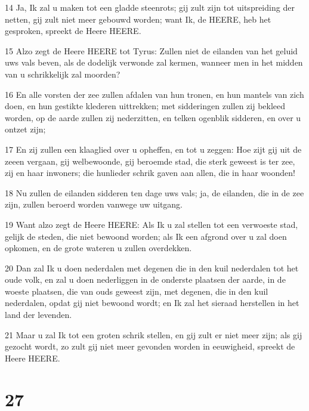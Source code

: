 \par 14 Ja, Ik zal u maken tot een gladde steenrots; gij zult zijn tot uitspreiding der netten, gij zult niet meer gebouwd worden; want Ik, de HEERE, heb het gesproken, spreekt de Heere HEERE.
\par 15 Alzo zegt de Heere HEERE tot Tyrus: Zullen niet de eilanden van het geluid uws vals beven, als de dodelijk verwonde zal kermen, wanneer men in het midden van u schrikkelijk zal moorden?
\par 16 En alle vorsten der zee zullen afdalen van hun tronen, en hun mantels van zich doen, en hun gestikte klederen uittrekken; met sidderingen zullen zij bekleed worden, op de aarde zullen zij nederzitten, en telken ogenblik sidderen, en over u ontzet zijn;
\par 17 En zij zullen een klaaglied over u opheffen, en tot u zeggen: Hoe zijt gij uit de zeeen vergaan, gij welbewoonde, gij beroemde stad, die sterk geweest is ter zee, zij en haar inwoners; die hunlieder schrik gaven aan allen, die in haar woonden!
\par 18 Nu zullen de eilanden sidderen ten dage uws vals; ja, de eilanden, die in de zee zijn, zullen beroerd worden vanwege uw uitgang.
\par 19 Want alzo zegt de Heere HEERE: Als Ik u zal stellen tot een verwoeste stad, gelijk de steden, die niet bewoond worden; als Ik een afgrond over u zal doen opkomen, en de grote wateren u zullen overdekken.
\par 20 Dan zal Ik u doen nederdalen met degenen die in den kuil nederdalen tot het oude volk, en zal u doen nederliggen in de onderste plaatsen der aarde, in de woeste plaatsen, die van ouds geweest zijn, met degenen, die in den kuil nederdalen, opdat gij niet bewoond wordt; en Ik zal het sieraad herstellen in het land der levenden.
\par 21 Maar u zal Ik tot een groten schrik stellen, en gij zult er niet meer zijn; als gij gezocht wordt, zo zult gij niet meer gevonden worden in eeuwigheid, spreekt de Heere HEERE.

\chapter{27}

